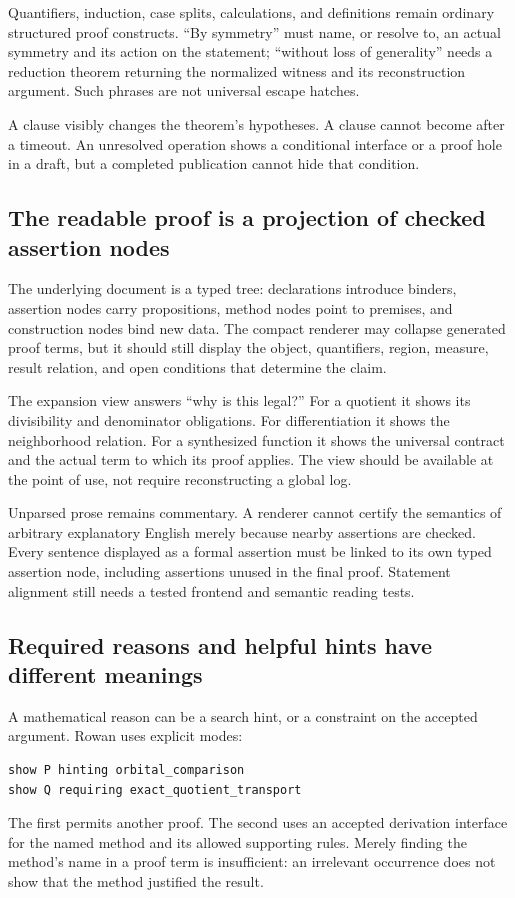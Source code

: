 \documentclass[11pt,letterpaper]{article}
\newcommand{\code}[1]{\texttt{\detokenize{#1}}}
\theoremstyle{definition}\newtheorem{definition}[theorem]{Definition}
\theoremstyle{remark}\newtheorem{remark}[theorem]{Remark}
\begin{document}
Quantifiers, induction, case splits, calculations, and definitions remain
ordinary structured proof constructs. ``By symmetry'' must name, or resolve
to, an actual symmetry and its action on the statement; ``without loss of
generality'' needs a reduction theorem returning the normalized witness and
its reconstruction argument. Such phrases are not universal escape hatches.

A \code{given} clause visibly changes the theorem's hypotheses. A \code{know}
clause cannot become \code{given} after a timeout. An unresolved operation
shows a conditional interface or a proof hole in a draft, but a completed
publication cannot hide that condition.

\subsection{The readable proof is a projection of checked assertion nodes}
The underlying document is a typed tree: declarations introduce binders,
assertion nodes carry propositions, method nodes point to premises, and
construction nodes bind new data. The compact renderer may collapse generated
proof terms, but it should still display the object, quantifiers, region,
measure, result relation, and open conditions that determine the claim.

The expansion view answers ``why is this legal?'' For a quotient it shows
its divisibility and denominator obligations. For differentiation it shows
the neighborhood relation. For a synthesized function it shows the universal
contract and the actual term to which its proof applies. The view should be
available at the point of use, not require reconstructing a global log.

Unparsed prose remains commentary. A renderer cannot certify the semantics of
arbitrary explanatory English merely because nearby assertions are checked.
Every sentence displayed as a formal assertion must be linked to its own
typed assertion node, including assertions unused in the final proof.
Statement alignment still needs a tested frontend and semantic reading tests.

\subsection{Required reasons and helpful hints have different meanings}
A mathematical reason can be a search hint, or a constraint on the accepted
argument. Rowan uses explicit modes:
\begin{lstlisting}
show P hinting orbital_comparison
show Q requiring exact_quotient_transport
\end{lstlisting}
The first permits another proof. The second uses an accepted derivation
interface for the named method and its allowed supporting rules. Merely
finding the method's name in a proof term is insufficient: an irrelevant
occurrence does not show that the method justified the result.
\end{document}
